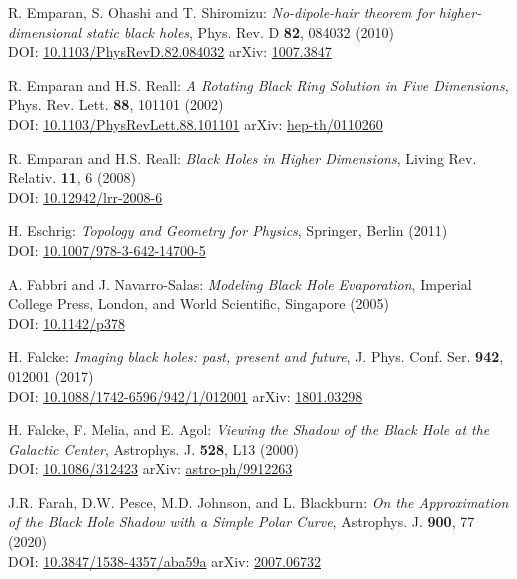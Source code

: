 \begin{thebibliography}{123}
R. Emparan, S. Ohashi and T. Shiromizu:
{\em No-dipole-hair theorem for higher-dimensional static black holes},
Phys. Rev. D {\bf 82}, 084032 (2010)\\
DOI: \href{https://doi.org/10.1103/PhysRevD.82.084032}{10.1103/PhysRevD.82.084032}\hfill
arXiv: \href{https://arxiv.org/abs/1007.3847}{1007.3847}

R. Emparan and H.S. Reall:
{\em A Rotating Black Ring Solution in Five Dimensions},
Phys. Rev. Lett. {\bf 88}, 101101 (2002)\\
DOI: \href{https://doi.org/10.1103/PhysRevLett.88.101101}{10.1103/PhysRevLett.88.101101}\hfill
arXiv: \href{https://arxiv.org/abs/hep-th/0110260}{hep-th/0110260}

R. Emparan and H.S. Reall:
{\em Black Holes in Higher Dimensions},
Living Rev. Relativ. {\bf 11}, 6 (2008)\\
DOI: \href{https://doi.org/10.12942/lrr-2008-6}{10.12942/lrr-2008-6}

H. Eschrig: {\em Topology and Geometry for Physics},
Springer, Berlin (2011)\\
DOI: \href{https://doi.org/10.1007/978-3-642-14700-5}{10.1007/978-3-642-14700-5}

A. Fabbri and J. Navarro-Salas:
{\em Modeling Black Hole Evaporation},
Imperial College Press, London, and World Scientific, Singapore (2005)\\
DOI: \href{https://doi.org/10.1142/p378}{10.1142/p378}

H. Falcke:
{\em Imaging black holes: past, present and future},
J. Phys. Conf. Ser. {\bf 942}, 012001 (2017)\\
DOI: \href{https://doi.org/10.1088/1742-6596/942/1/012001}{10.1088/1742-6596/942/1/012001}\hfill
arXiv: \href{https://arxiv.org/abs/1801.03298}{1801.03298}

H. Falcke, F. Melia, and E. Agol:
{\em Viewing the Shadow of the Black Hole at the Galactic Center},
Astrophys. J. {\bf 528}, L13 (2000)\\
DOI: \href{https://doi.org/10.1086/312423}{10.1086/312423}\hfill
arXiv: \href{https://arxiv.org/abs/astro-ph/9912263}{astro-ph/9912263}

J.R. Farah, D.W. Pesce, M.D. Johnson, and L. Blackburn:
{\em On the Approximation of the Black Hole Shadow with a Simple Polar Curve},
Astrophys. J. {\bf 900}, 77 (2020)\\
DOI: \href{https://doi.org/10.3847/1538-4357/aba59a}{10.3847/1538-4357/aba59a}\hfill
arXiv: \href{https://arxiv.org/abs/2007.06732}{2007.06732}


\end{thebibliography}
